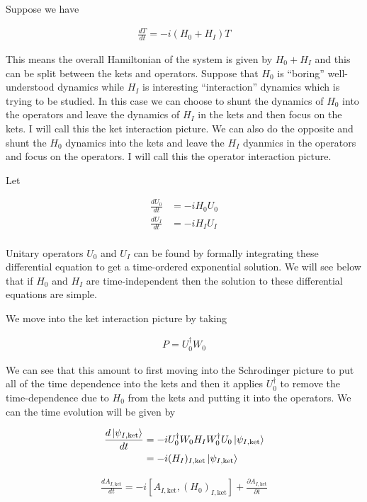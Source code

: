 \documentclass[12pt]{article}
\newcommand{\ddt}[1]{\frac{d #1}{dt}}
\newcommand{\ppt}[1]{\frac{\partial #1}{\partial t}}
\begin{document}
Suppose we have

\begin{align}
\ddt{T} = -i(H_0 + H_I) T
\end{align}

This means the overall Hamiltonian of the system is given by $H_0 + H_I$ and this can be split between the kets and operators. Suppose that $H_0$ is ``boring'' well-understood dynamics while $H_I$ is interesting ``interaction'' dynamics which is trying to be studied. In this case we can choose to shunt the dynamics of $H_0$ into the operators and leave the dynamics of $H_I$ in the kets and then focus on the kets. I will call this the ket interaction picture. We can also do the opposite and shunt the $H_0$ dynamics into the kets and leave the $H_I$ dyanmics in the operators and focus on the operators. I will call this the operator interaction picture.

Let

\begin{align}
\ddt{U_0} &= -iH_0 U_0\\
\ddt{U_I} &= -iH_I U_I\\
\end{align}

Unitary operators $U_0$ and $U_I$ can be found by formally integrating these differential equation to get a time-ordered exponential solution. We will see below that if $H_0$ and $H_I$ are time-independent then the solution to these differential equations are simple.

We move into the ket interaction picture by taking

\begin{align}
P = U_0^{\dag}W_0
\end{align}

We can see that this amount to first moving into the Schrodinger picture to put all of the time dependence into the kets and then it applies $U_0^{\dag}$ to remove the time-dependence due to $H_0$ from the kets and putting it into the operators. We can the time evolution will be given by

\begin{align}
\ddt{\ket{\psi_{I,\text{ket}}}} &= -i U_0^{\dag}W_0H_IW_0^{\dag}U_0 \ket{\psi_{I,\text{ket}}}\\
&= -i (H_I)_{I,\text{ket}} \ket{\psi_{I,\text{ket}}}
\end{align}

\begin{align}
\ddt{A_{I,\text{ket}}} = -i[A_{I,\text{ket}}, (H_0)_{I,\text{ket}} ] + \ppt{A_{I,\text{ket}}}
\end{align}
\end{document}
